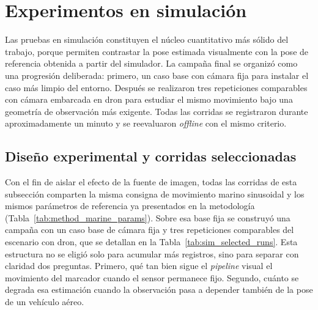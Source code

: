 \documentclass[12pt,a4paper]{report}
\begin{document}
\section{Experimentos en simulación}

Las pruebas en simulación constituyen el núcleo cuantitativo más sólido del
trabajo, porque permiten contrastar la pose estimada visualmente con la pose de
referencia obtenida a partir del simulador. La campaña final se organizó como
una progresión deliberada: primero, un caso base con cámara fija para instalar el
caso más limpio del entorno. Después se realizaron tres repeticiones comparables con cámara
embarcada en dron para estudiar el mismo movimiento bajo una geometría de
observación más exigente. Todas las corridas se registraron durante
aproximadamente un minuto y se reevaluaron \textit{offline} con el mismo
criterio.

\subsection{Diseño experimental y corridas seleccionadas}

Con el fin de aislar el efecto de la fuente de imagen, todas las corridas de
esta subsección comparten la misma consigna de movimiento marino sinusoidal y
los mismos parámetros de referencia ya presentados en la metodología
(Tabla~\ref{tab:method_marine_params}). Sobre esa base fija se construyó una
campaña con un caso base de cámara fija y tres repeticiones comparables del
escenario con dron, que se detallan en la
Tabla~\ref{tab:sim_selected_runs}. Esta estructura no se eligió solo para acumular más
registros, sino para separar con claridad dos preguntas.
Primero, qué tan bien sigue el \textit{pipeline} visual el movimiento del marcador cuando
el sensor permanece fijo. Segundo, cuánto se degrada esa estimación cuando la
observación pasa a depender también de la pose de un vehículo aéreo.
\end{document}
